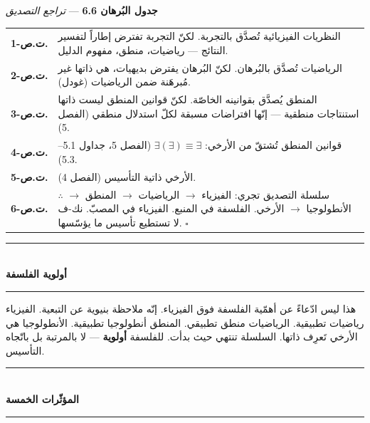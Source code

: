 \documentclass[10pt, openany, oneside]{book}
\renewcommand{\normalsize}{\fontsize{10}{13}\selectfont}
\renewcommand{\footnotesize}{\fontsize{8.5}{11}\selectfont}
\begin{document}
\textbf{جدول البُرهان 6.6} --- \textit{تراجع التصديق}

\vspace{0.5em}

{\footnotesize
\noindent\begin{tabular}{r p{}}
\textbf{ت.ص-1.} & النظريات الفيزيائية تُصدَّق بالتجربة. لكنّ التجربة تفترض إطاراً لتفسير النتائج --- رياضيات، منطق، مفهوم الدليل. \\[0.3em]
\textbf{ت.ص-2.} & الرياضيات تُصدَّق بالبُرهان. لكنّ البُرهان يفترض بديهيات، هي ذاتها غير مُبرهَنة ضمن الرياضيات (غودل). \\[0.3em]
\textbf{ت.ص-3.} & المنطق يُصدَّق بقوانينه الخاصّة. لكنّ قوانين المنطق ليست ذاتها استنتاجات منطقية --- إنّها افتراضات مسبقة لكلّ استدلال منطقي (الفصل 5). \\[0.3em]
\textbf{ت.ص-4.} & قوانين المنطق تُشتقّ من الأرخي: $\exists(\exists) \equiv \exists$ (الفصل 5، جداول 5.1--5.3). \\[0.3em]
\textbf{ت.ص-5.} & الأرخي ذاتية التأسيس (الفصل 4). \\[0.3em]
\textbf{ت.ص-6.} & $\therefore$ سلسلة التصديق تجري: الفيزياء $\to$ الرياضيات $\to$ المنطق $\to$ الأنطولوجيا $\to$ الأرخي. الفلسفة في المنبع. الفيزياء في المصبّ. نك-ف لا تستطيع تأسيس ما يؤسّسها. $\square$ \\[0.3em]
\end{tabular}
}

\vspace{0.8em}


\begin{center}
    \rule{0.3\textwidth}{0.4pt}\\[0.5em]
    {\normalsize\bfseries أولوية الفلسفة}\\[0.3em]
    \rule{0.3\textwidth}{0.4pt}
\end{center}

\vspace{1em}

\noindent هذا ليس ادّعاءً عن أهمّية الفلسفة فوق الفيزياء. إنّه ملاحظة بنيوية عن التبعية. الفيزياء رياضيات تطبيقية. الرياضيات منطق تطبيقي. المنطق أنطولوجيا تطبيقية. الأنطولوجيا هي الأرخي تَعرِف ذاتها. السلسلة تنتهي حيث بدأت. للفلسفة \textbf{أولوية} --- لا بالمرتبة بل باتّجاه التأسيس.

\vspace{1.5em}


\begin{center}
    \rule{0.3\textwidth}{0.4pt}\\[0.5em]
    {\normalsize\bfseries المؤثّرات الخمسة}\\[0.3em]
    \rule{0.3\textwidth}{0.4pt}
\end{center}
\end{document}
